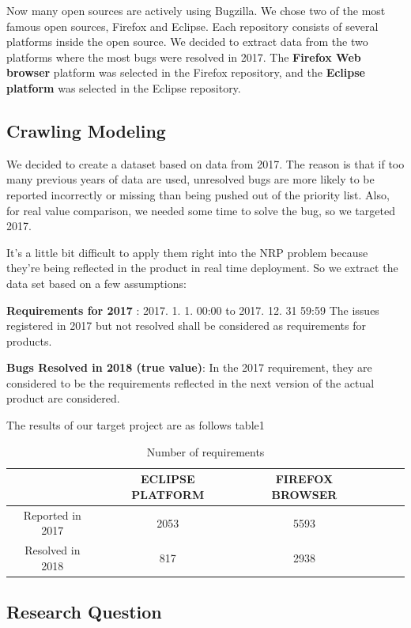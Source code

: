 Now many open sources are actively using Bugzilla. We chose two of the most famous open sources, Firefox and Eclipse. Each repository consists of several platforms inside the open source. We decided to extract data from the two platforms where the most bugs were resolved in 2017. The \textbf{Firefox Web browser} platform was selected in the Firefox repository, and the \textbf{Eclipse platform} was selected in the Eclipse repository.


\subsection{Crawling Modeling}

We decided to create a dataset based on data from 2017. The reason is that if too many previous years of data are used, unresolved bugs are more likely to be reported incorrectly or missing than being pushed out of the priority list. Also, for real value comparison, we  needed some time to solve the bug, so we targeted 2017.

It's a little bit difficult to apply them right into the NRP problem because they're being reflected in the product in real time deployment. So we extract the data set based on a few assumptions:

\textbf{Requirements for 2017} : 2017. 1. 1. 00:00 to 2017. 12. 31 59:59 The issues registered in 2017 but not resolved shall be considered as requirements for products.

\textbf{Bugs Resolved in 2018 (true value)}: In the 2017 requirement, they are considered to be the requirements reflected in the next version of the actual product are considered.

The results of our target project are as follows table1
\begin{table} [H]
  \caption{Number of requirements}
  \label{tab:commands}
  \begin{tabular}{cccccl}
    \toprule
    &ECLIPSE PLATFORM&FIREFOX BROWSER\\
    \midrule
    Reported in 2017& 2053 & 5593 \\
    Resolved in 2018 & 817 & 2938 \\
    \bottomrule
  \end{tabular}
\label{table:Dataset}
\end{table}


\subsection{Research Question}

